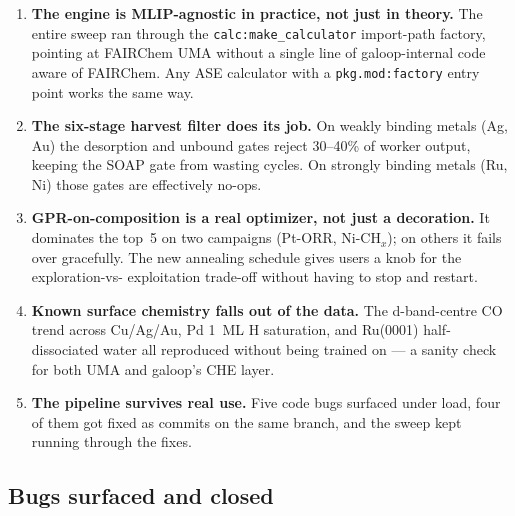 \documentclass[11pt,letterpaper]{article}
\begin{document}
\begin{enumerate}
  \item \textbf{The engine is MLIP-agnostic in practice, not just in
    theory.} The entire sweep ran through the
    \texttt{calc:make\_calculator} import-path factory,
    pointing at FAIRChem UMA without a single line of galoop-internal
    code aware of FAIRChem. Any ASE calculator with a
    \texttt{pkg.mod:factory} entry point works the same way.
  \item \textbf{The six-stage harvest filter does its job.} On weakly
    binding metals (Ag, Au) the desorption and unbound gates reject
    30--40\% of worker output, keeping the SOAP gate from wasting
    cycles. On strongly binding metals (Ru, Ni) those gates are
    effectively no-ops.
  \item \textbf{GPR-on-composition is a real optimizer, not just a
    decoration.} It dominates the top~5 on two campaigns (Pt-ORR,
    Ni-CH$_x$); on others it fails over gracefully. The new
    annealing schedule gives users a knob for the exploration-vs-
    exploitation trade-off without having to stop and restart.
  \item \textbf{Known surface chemistry falls out of the data.} The
    d-band-centre CO trend across Cu/Ag/Au, Pd 1~ML H saturation,
    and Ru(0001) half-dissociated water all reproduced without being
    trained on — a sanity check for both UMA and galoop's CHE layer.
  \item \textbf{The pipeline survives real use.} Five code bugs
    surfaced under load, four of them got fixed as commits on the
    same branch, and the sweep kept running through the fixes.
\end{enumerate}

\subsection{Bugs surfaced and closed}
\end{document}
